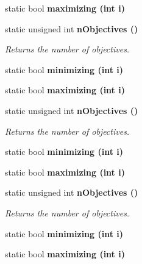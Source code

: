 \begin{CompactItemize}
\item 
static bool \bf{maximizing} (int i)\label{classObjectiveVectorTraits_69ddc04a4bf7b842f5457f7cff09c479}

\item 
static unsigned int \bf{n\-Objectives} ()\label{classObjectiveVectorTraits_8f8cb44cfe76117ab1c5624e4fced91f}

\begin{CompactList}\small\item\em Returns the number of objectives. \item\end{CompactList}\item 
static bool \bf{minimizing} (int i)\label{classObjectiveVectorTraits_52dc1c3dd95f37fe256708f40189a6fd}

\item 
static bool \bf{maximizing} (int i)\label{classObjectiveVectorTraits_69ddc04a4bf7b842f5457f7cff09c479}

\item 
static unsigned int \bf{n\-Objectives} ()\label{classObjectiveVectorTraits_8f8cb44cfe76117ab1c5624e4fced91f}

\begin{CompactList}\small\item\em Returns the number of objectives. \item\end{CompactList}\item 
static bool \bf{minimizing} (int i)\label{classObjectiveVectorTraits_52dc1c3dd95f37fe256708f40189a6fd}

\item 
static bool \bf{maximizing} (int i)\label{classObjectiveVectorTraits_69ddc04a4bf7b842f5457f7cff09c479}

\item 
static unsigned int \bf{n\-Objectives} ()\label{classObjectiveVectorTraits_8f8cb44cfe76117ab1c5624e4fced91f}

\begin{CompactList}\small\item\em Returns the number of objectives. \item\end{CompactList}\item 
static bool \bf{minimizing} (int i)\label{classObjectiveVectorTraits_52dc1c3dd95f37fe256708f40189a6fd}

\item 
static bool \bf{maximizing} (int i)\label{classObjectiveVectorTraits_69ddc04a4bf7b842f5457f7cff09c479}


\end{CompactItemize}
